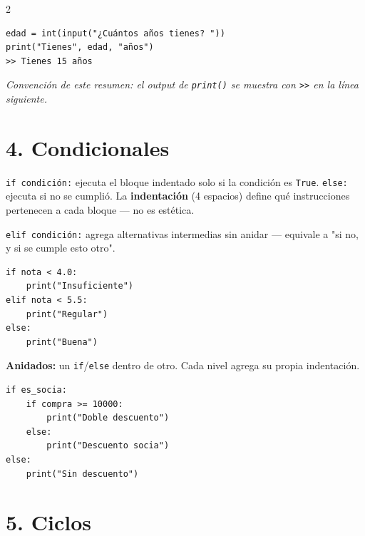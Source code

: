 \documentclass[10pt]{article}
\begin{document}
\begin{multicols}{2}
\begin{cajacodigo}
\begin{Verbatim}[fontsize=\footnotesize]
edad = int(input("¿Cuántos años tienes? "))
print("Tienes", edad, "años")
>> Tienes 15 años
\end{Verbatim}
\end{cajacodigo}

\textit{Convención de este resumen: el output de \texttt{print()} se muestra con \texttt{>>} en la línea siguiente.}

\section*{4. Condicionales}

\texttt{if condición:} ejecuta el bloque indentado solo si la condición es \texttt{True}. \texttt{else:} ejecuta si no se cumplió. La \textbf{indentación} (4 espacios) define qué instrucciones pertenecen a cada bloque --- no es estética.

\texttt{elif condición:} agrega alternativas intermedias sin anidar --- equivale a "si no, y si se cumple esto otro".

\begin{cajacodigo}
\begin{Verbatim}[fontsize=\footnotesize]
if nota < 4.0:
    print("Insuficiente")
elif nota < 5.5:
    print("Regular")
else:
    print("Buena")
\end{Verbatim}
\end{cajacodigo}

\textbf{Anidados:} un \texttt{if}/\texttt{else} dentro de otro. Cada nivel agrega su propia indentación.

\begin{cajacodigo}
\begin{Verbatim}[fontsize=\footnotesize]
if es_socia:
    if compra >= 10000:
        print("Doble descuento")
    else:
        print("Descuento socia")
else:
    print("Sin descuento")
\end{Verbatim}
\end{cajacodigo}

\section*{5. Ciclos}


\end{multicols}
\end{document}
